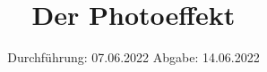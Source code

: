 

\subject{V500}
\title{Der Photoeffekt}
\date{%
  Durchführung: 07.06.2022
  \hspace{3em}
  Abgabe: 14.06.2022
}



\maketitle
\thispagestyle{empty}
\tableofcontents
\newpage






\printbibliography{}





